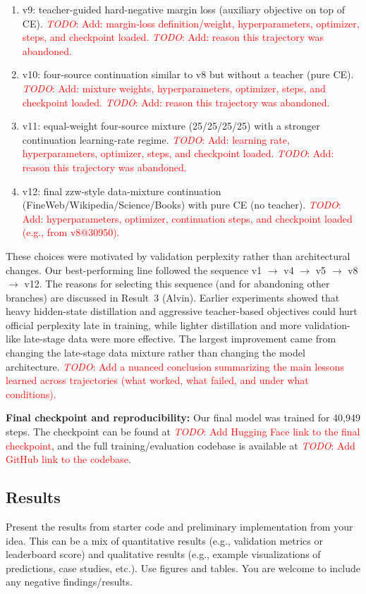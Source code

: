 \documentclass{article}
\renewcommand{\todo}[1]{\textcolor{red}{\emph{TODO}: #1}}
\begin{document}
\begin{enumerate}
    \item v9: teacher-guided hard-negative margin loss (auxiliary objective on top of CE). \todo{Add: margin-loss definition/weight, hyperparameters, optimizer, steps, and checkpoint loaded.} \todo{Add: reason this trajectory was abandoned.}
    \item v10: four-source continuation similar to v8 but without a teacher (pure CE). \todo{Add: mixture weights, hyperparameters, optimizer, steps, and checkpoint loaded.} \todo{Add: reason this trajectory was abandoned.}
    \item v11: equal-weight four-source mixture (25/25/25/25) with a stronger continuation learning-rate regime. \todo{Add: learning rate, hyperparameters, optimizer, steps, and checkpoint loaded.} \todo{Add: reason this trajectory was abandoned.}
    \item v12: final zzw-style data-mixture continuation (FineWeb/Wikipedia/Science/Books) with pure CE (no teacher). \todo{Add: hyperparameters, optimizer, continuation steps, and checkpoint loaded (e.g., from v8@30950).}
\end{enumerate}

These choices were motivated by validation perplexity rather than architectural changes. Our best-performing line followed the sequence v1 $\rightarrow$ v4 $\rightarrow$ v5 $\rightarrow$ v8 $\rightarrow$ v12. The reasons for selecting this sequence (and for abandoning other branches) are discussed in Result~3 (Alvin). Earlier experiments showed that heavy hidden-state distillation and aggressive teacher-based objectives could hurt official perplexity late in training, while lighter distillation and more validation-like late-stage data were more effective. The largest improvement came from changing the late-stage data mixture rather than changing the model architecture. \todo{Add a nuanced conclusion summarizing the main lessons learned across trajectories (what worked, what failed, and under what conditions).}

\noindent\textbf{Final checkpoint and reproducibility:} Our final model was trained for 40,949 steps. The checkpoint can be found at \todo{Add Hugging Face link to the final checkpoint}, and the full training/evaluation codebase is available at \todo{Add GitHub link to the codebase}.
% 
\subsection{Results}
\label{sec:results}
Present the results from starter code and preliminary implementation from your idea. This can be a mix of quantitative results (e.g., validation metrics or leaderboard score) and qualitative results (e.g., example visualizations of predictions, case studies, etc.). Use figures and tables. You are welcome to include any negative findings/results.
\end{document}

